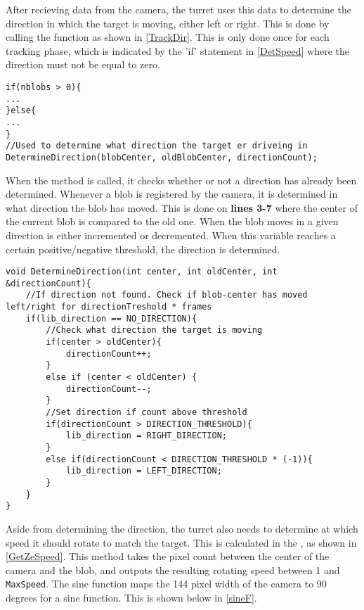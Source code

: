 After recieving data from the camera, the turret uses this data to determine the
direction in which the target is moving, either left or right. This is done by
calling the  function as shown in
\autoref{TrackDir}. This is only done once for each tracking phase, which is
indicated by the 'if' statement in \autoref{DetSpeed} where the direction
must not be equal to zero.\nl

\begin{minipage}[H]{\linewidth}
\begin{lstlisting}[caption = Call DetermineDirection., label = TrackDir]
if(nblobs > 0){
...
}else{
...
}
//Used to determine what direction the target er driveing in
DetermineDirection(blobCenter, oldBlobCenter, directionCount);
\end{lstlisting}
\end{minipage}

When the  method is called, it checks
whether or not a direction has already been determined. Whenever a blob is
registered by the camera, it is determined in what direction the blob has
moved. This is done on \textbf{lines 3-7} where the center of the
current blob is compared to the old one. When the blob moves in a given
direction  is either incremented or decremented.
When this variable reaches a certain positive/negative threshold, the direction
is determined.\nl

\begin{minipage}[H]{\linewidth}
\begin{lstlisting}[caption = Determine the targets direction., label = DeterDir]
void DetermineDirection(int center, int oldCenter, int &directionCount){
    //If direction not found. Check if blob-center has moved left/right for directionTreshold * frames
    if(lib_direction == NO_DIRECTION){
        //Check what direction the target is moving
        if(center > oldCenter){
            directionCount++;
        }
        else if (center < oldCenter) {
            directionCount--;
        }
        //Set direction if count above threshold
        if(directionCount > DIRECTION_THRESHOLD){
            lib_direction = RIGHT_DIRECTION;
        }
        else if(directionCount < DIRECTION_THRESHOLD * (-1)){
            lib_direction = LEFT_DIRECTION;
        }
    }
}
\end{lstlisting}
\end{minipage}

Aside from determining the direction, the turret also needs to determine at
which speed it should rotate to match the target. This is calculated in the
, as shown in \autoref{GetZeSpeed}. This method
takes the pixel count between the center of the camera and the blob, and outputs
the resulting rotating speed between 1 and \texttt{MaxSpeed}. The sine function
maps the 144 pixel width of the camera to 90 degrees for a sine function. This is shown below in
\autoref{sineF}.


